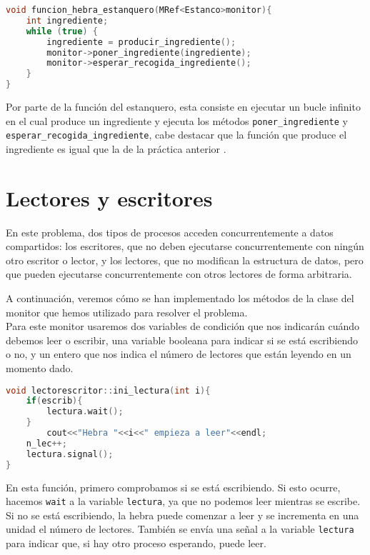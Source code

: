 \documentclass{article}
\begin{document}
\begin{lstlisting}[language=C++,caption=función estanquero] 
void funcion_hebra_estanquero(MRef<Estanco>monitor){
	int ingrediente;
	while (true) {
 		ingrediente = producir_ingrediente();
		monitor->poner_ingrediente(ingrediente);
		monitor->esperar_recogida_ingrediente();
	}
}
\end{lstlisting}
Por parte de la función del estanquero, esta consiste en ejecutar un bucle infinito en el cual produce un ingrediente y ejecuta los métodos \texttt{poner\_ingrediente} y \texttt{esperar\_recogida\_ingrediente}, cabe destacar que la función que produce el ingrediente es igual que la de la práctica anterior .


\section{Lectores y escritores}

En este problema, dos tipos de procesos acceden concurrentemente a datos compartidos: los escritores, que no deben ejecutarse concurrentemente con ningún otro escritor o lector, y los lectores, que no modifican la estructura de datos, pero que pueden ejecutarse concurrentemente con otros lectores de forma arbitraria.

A continuación, veremos cómo se han implementado los métodos de la clase del monitor que hemos utilizado para resolver el problema.\\

Para este monitor usaremos dos variables de condición que nos indicarán cuándo debemos leer o escribir, una variable booleana para indicar si se está escribiendo o no, y un entero que nos indica el número de lectores que están leyendo en un momento dado.



\begin{lstlisting}[language=C++,caption=función inicio de lectura] 
void lectorescritor::ini_lectura(int i){
	if(escrib){
		lectura.wait();
	}
		cout<<"Hebra "<<i<<" empieza a leer"<<endl;
	n_lec++;
	lectura.signal();
}
\end{lstlisting}

En esta función, primero comprobamos si se está escribiendo. Si esto ocurre, hacemos \texttt{wait} a la variable \texttt{lectura}, ya que no podemos leer mientras se escribe. Si no se está escribiendo, la hebra puede comenzar a leer y se incrementa en una unidad el número de lectores. También se envía una señal a la variable \texttt{lectura} para indicar que, si hay otro proceso esperando, puede leer.
\end{document}
